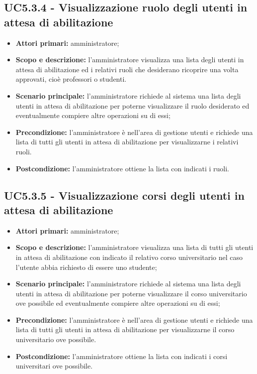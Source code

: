 \documentclass[AnalisiDeiRequisiti.tex]{subfiles}
\begin{document}
\subsection{UC5.3.4 - Visualizzazione ruolo degli utenti in attesa di abilitazione}
\begin{itemize}
	\item \textbf{Attori primari:} amministratore;
	\item \textbf{Scopo e descrizione:} l'amministratore visualizza una lista degli utenti in attesa di abilitazione ed i relativi ruoli che desiderano ricoprire una volta approvati, cioè professori o studenti.
	\item \textbf{Scenario principale:} l'amministratore richiede al sistema una lista degli utenti in attesa di abilitazione per poterne visualizzare il ruolo desiderato ed eventualmente compiere altre operazioni su di essi;
	\item \textbf{Precondizione:} l'amministratore è nell'area di gestione utenti e richiede una lista di tutti gli utenti in attesa di abilitazione per visualizzarne i relativi ruoli.
	\item \textbf{Postcondizione:} l'amministratore ottiene la lista con indicati i ruoli.
\end{itemize}
\subsection{UC5.3.5 - Visualizzazione corsi degli utenti in attesa di abilitazione}
\begin{itemize}
	\item \textbf{Attori primari:} amministratore;
	\item \textbf{Scopo e descrizione:} l'amministratore visualizza una lista di tutti gli utenti in attesa di abilitazione con indicato il relativo corso universitario nel caso l'utente abbia richiesto di essere uno studente;
	\item \textbf{Scenario principale:} l'amministratore richiede al sistema una lista degli utenti in attesa di abilitazione per poterne visualizzare il corso universitario ove possibile ed eventualmente compiere altre operazioni su di essi;
	\item \textbf{Precondizione:} l'amministratore è nell'area di gestione utenti e richiede una lista di tutti gli utenti in attesa di abilitazione per visualizzarne il corso universitario ove possibile.
	\item \textbf{Postcondizione:} l'amministratore ottiene la lista con indicati i corsi universitari ove possibile.
\end{itemize}
\end{document}
